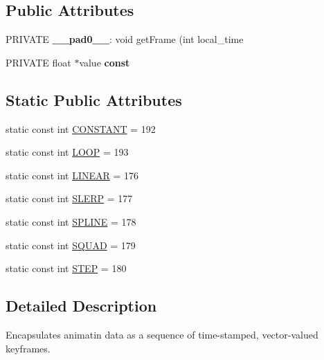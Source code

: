 \subsection*{Public Attributes}
\begin{CompactItemize}
\item 
\hypertarget{classm3g_1_1KeyframeSequence_09d77e6556195583218cf7f0bc11ab1c}{
PRIVATE \textbf{\_\-\_\-pad0\_\-\_\-}: void getFrame (int local\_\-time}
\label{classm3g_1_1KeyframeSequence_09d77e6556195583218cf7f0bc11ab1c}

\item 
\hypertarget{classm3g_1_1KeyframeSequence_2216ebfe3179bd5c53663d0780a0a190}{
PRIVATE float $\ast$value \textbf{const}}
\label{classm3g_1_1KeyframeSequence_2216ebfe3179bd5c53663d0780a0a190}

\end{CompactItemize}
\subsection*{Static Public Attributes}
\begin{CompactItemize}
\item 
static const int \hyperlink{classm3g_1_1KeyframeSequence_b45ff833865ae8962be27923995f91a3}{CONSTANT} = 192
\item 
static const int \hyperlink{classm3g_1_1KeyframeSequence_ecc439231d4f3639e6f6a9625615a0f7}{LOOP} = 193
\item 
static const int \hyperlink{classm3g_1_1KeyframeSequence_23ccf193c67257f1be26417041cecb31}{LINEAR} = 176
\item 
static const int \hyperlink{classm3g_1_1KeyframeSequence_77ebb943765f530d2883e1c26127d3ce}{SLERP} = 177
\item 
static const int \hyperlink{classm3g_1_1KeyframeSequence_fbb002ac924c1349dead17c16b6fa720}{SPLINE} = 178
\item 
static const int \hyperlink{classm3g_1_1KeyframeSequence_0ad85e76e101b5eabf5a5c5f48648845}{SQUAD} = 179
\item 
static const int \hyperlink{classm3g_1_1KeyframeSequence_07dc1c0bf7f480095150d1b1c34c8218}{STEP} = 180
\end{CompactItemize}


\subsection{Detailed Description}
Encapsulates animatin data as a sequence of time-stamped, vector-valued keyframes. 

